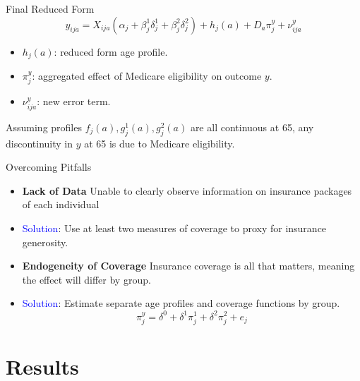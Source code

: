 \documentclass[aspectratio=169,professionalfonts]{beamer}
\newcommand{\beq}[1]{\begin{equation}\label{#1}}
\newcommand{\eeq}{\end{equation}}
\newcommand{\hl}[1]{\textbf{\textcolor{UGARed}{#1}}}
\begin{document}
\begin{frame}{Final Reduced Form}
  \beq{eq:final}
    y_{ija} = X_{ija}(\alpha_j + \beta_j^1\delta_j^1 + \beta_j^2\delta_j^2) + h_j(a) + D_a\pi_j^y + \nu_{ija}^y
  \eeq
  \begin{itemize}
    \item $h_j(a)$: reduced form age profile.
    \item $\pi_j^y$: aggregated effect of Medicare eligibility on outcome $y$.
    \item $\nu_{ija}^y$: new error term.
  \end{itemize}
  Assuming profiles $f_j(a), g_j^1(a), g_j^2(a)$ are all continuous at 65, any discontinuity in $y$ at 65 is due to Medicare eligibility.
\end{frame}

\begin{frame}{Overcoming Pitfalls}
  \begin{itemize}
    \item \hl{Lack of Data} Unable to clearly observe information on insurance packages of each individual
    \item \textcolor{blue}{Solution}: Use at least two measures of coverage to proxy for insurance generosity.
    \item \hl{Endogeneity of Coverage} Insurance coverage is all that matters, meaning the effect will differ by group.
    \item \textcolor{blue}{Solution}: Estimate separate age profiles and coverage functions by group.
    \beq{eq:disconinuity est}
      \pi_j^y = \delta^0 + \delta^1\pi_j^1 + \delta^2\pi_j^2 + e_j
    \eeq
  \end{itemize}
\end{frame}

\section{Results}
\end{document}
